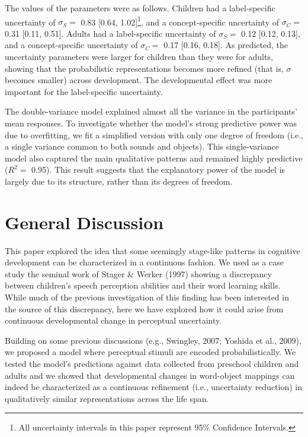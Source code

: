 \documentclass[10pt, letterpaper]{article}
\begin{document}
The values of the parameters were as follows. Children had a
label-specific uncertainty of \(\sigma_S =\) 0.83 {[}0.64,
1.02{]}\footnote{All uncertainty intervals in this paper represent 95\% Confidence Intervals.},
and a concept-specific uncertainty of \(\sigma_C =\) 0.31 {[}0.11,
0.51{]}. Adults had a label-specific uncertainty of \(\sigma_S =\) 0.12
{[}0.12, 0.13{]}, and a concept-specific uncertainty of \(\sigma_C =\)
0.17 {[}0.16, 0.18{]}. As predicted, the uncertainty parameters were
larger for children than they were for adults, showing that the
probabilistic representations becomes more refined (that is, \(\sigma\)
becomes smaller) across development. The developmental effect was more
important for the label-specific uncertainty.

The double-variance model explained almost all the variance in the
participants' mean responses. To investigate whether the model's strong
predictive power was due to overfitting, we fit a simplified version
with only one degree of freedom (i.e., a single variance common to both
sounds and objects). This single-variance model also captured the main
qualitative patterns and remained highly predictive (\(R^2=\) 0.95).
This result suggests that the explanatory power of the model is largely
due to its structure, rather than its degrees of freedom.

\section{General Discussion}\label{general-discussion}

This paper explored the idea that some seemingly stage-like patterns in
cognitive development can be characterized in a continuous fashion. We
used as a case study the seminal work of Stager \& Werker (1997) showing
a discrepancy between children's speech perception abilities and their
word learning skills. While much of the previous investigation of this
finding has been interested in the source of this discrepancy, here we
have explored how it could arise from continuous developmental change in
perceptual uncertainty.

Building on some previous discussions (e.g., Swingley, 2007; Yoshida et
al., 2009), we proposed a model where perceptual stimuli are encoded
probabilistically. We tested the model's predictions against data
collected from preschool children and adults and we showed that
developmental changes in word-object mappings can indeed be
characterized as a continuous refinement (i.e., uncertainty reduction)
in qualitatively similar representations across the life span.
\end{document}
